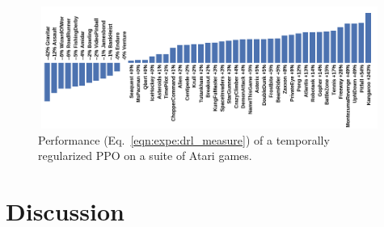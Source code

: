 \documentclass{article}
\begin{document}
\begin{figure}
    \centering
    \includegraphics[width=13cm,height=4cm]{bar_atari.png}
    \caption{Performance (Eq.~\ref{eqn:expe:drl_measure}) of a temporally regularized PPO on a suite of Atari games.}
    \label{fig:graph_atari}
\end{figure}


\section{Discussion}
\end{document}
